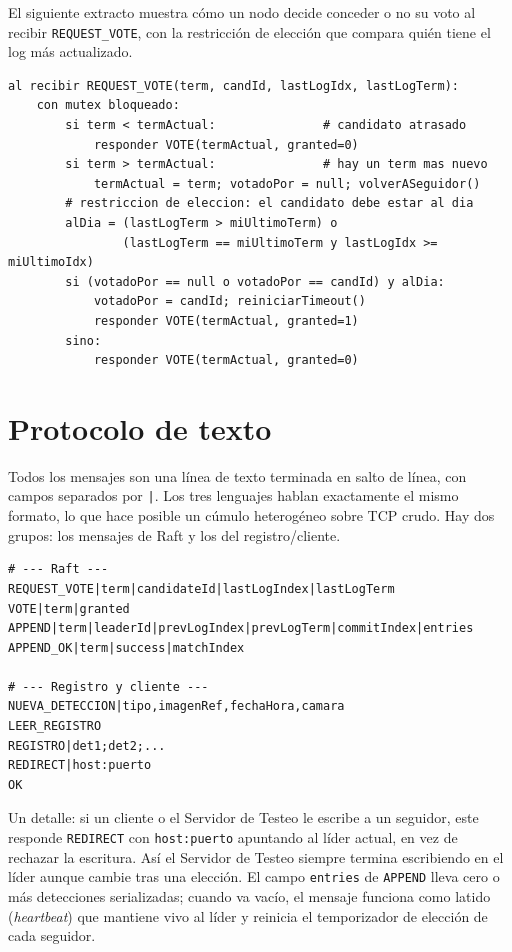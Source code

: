 \documentclass[11pt,a4paper]{article}
\begin{document}
El siguiente extracto muestra c\'omo un nodo decide conceder o no su voto al
recibir \texttt{REQUEST\_VOTE}, con la restricci\'on de elecci\'on que compara
qui\'en tiene el log m\'as actualizado.

\begin{lstlisting}[caption={L\'ogica de voto al recibir \texttt{REQUEST\_VOTE} (misma en los 3 nodos).}]
al recibir REQUEST_VOTE(term, candId, lastLogIdx, lastLogTerm):
    con mutex bloqueado:
        si term < termActual:               # candidato atrasado
            responder VOTE(termActual, granted=0)
        si term > termActual:               # hay un term mas nuevo
            termActual = term; votadoPor = null; volverASeguidor()
        # restriccion de eleccion: el candidato debe estar al dia
        alDia = (lastLogTerm > miUltimoTerm) o
                (lastLogTerm == miUltimoTerm y lastLogIdx >= miUltimoIdx)
        si (votadoPor == null o votadoPor == candId) y alDia:
            votadoPor = candId; reiniciarTimeout()
            responder VOTE(termActual, granted=1)
        sino:
            responder VOTE(termActual, granted=0)
\end{lstlisting}

\section{Protocolo de texto}\label{sec:proto}
Todos los mensajes son una l\'inea de texto terminada en salto de l\'inea, con
campos separados por \texttt{|}. Los tres lenguajes hablan exactamente el mismo
formato, lo que hace posible un c\'umulo heterog\'eneo sobre TCP crudo. Hay dos
grupos: los mensajes de Raft y los del registro/cliente.

\begin{lstlisting}[caption={Protocolo de texto compartido (Raft + registro).}]
# --- Raft ---
REQUEST_VOTE|term|candidateId|lastLogIndex|lastLogTerm
VOTE|term|granted
APPEND|term|leaderId|prevLogIndex|prevLogTerm|commitIndex|entries
APPEND_OK|term|success|matchIndex

# --- Registro y cliente ---
NUEVA_DETECCION|tipo,imagenRef,fechaHora,camara
LEER_REGISTRO
REGISTRO|det1;det2;...
REDIRECT|host:puerto
OK
\end{lstlisting}

Un detalle: si un cliente o el Servidor de Testeo le escribe a un seguidor,
este responde \texttt{REDIRECT} con \texttt{host:puerto} apuntando al l\'ider
actual, en vez de rechazar la escritura. As\'i el Servidor de Testeo siempre
termina escribiendo en el l\'ider aunque cambie tras una elecci\'on. El campo
\texttt{entries} de \texttt{APPEND} lleva cero o m\'as detecciones serializadas;
cuando va vac\'io, el mensaje funciona como latido (\emph{heartbeat}) que
mantiene vivo al l\'ider y reinicia el temporizador de elecci\'on de cada
seguidor.
\end{document}
